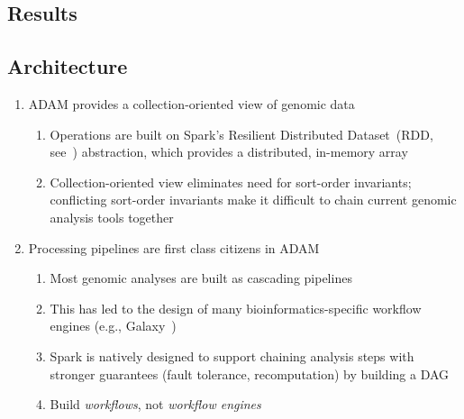 \documentclass{nature}
\begin{document}
\begin{refsegment}
\section{Results}
\label{sec:results}

\subsection{Architecture}
\label{sec:architecture}

\begin{enumerate}
\item ADAM provides a collection-oriented view of genomic data
\begin{enumerate}
\item Operations are built on Spark's Resilient Distributed Dataset~(RDD, see~\cite{zaharia12})
abstraction, which provides a distributed, in-memory array
\item Collection-oriented view eliminates need for sort-order invariants; conflicting sort-order
invariants make it difficult to chain current genomic analysis tools together
\end{enumerate}
\item Processing pipelines are first class citizens in ADAM
\begin{enumerate}
\item Most genomic analyses are built as cascading pipelines
\item This has led to the design of many bioinformatics-specific workflow engines (e.g.,
Galaxy~\cite{goecks10})
\item Spark is natively designed to support chaining analysis steps with stronger
guarantees (fault tolerance, recomputation) by building a DAG~\cite{zaharia10}
\item Build \emph{workflows}, not \emph{workflow engines}
\end{enumerate}
\end{enumerate}

\printbibliography[segment=1]
\end{refsegment}
\end{document}
